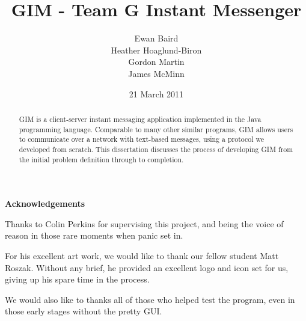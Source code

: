 \documentclass{l3proj}
\makeatletter
\newcommand\ackname{Acknowledgements}
\newenvironment{acknowledgements}{%
      \titlepage
      \null\vfil
      \@beginparpenalty\@lowpenalty
      \begin{center}%
        \bfseries \ackname
        \@endparpenalty\@M
      \end{center}}%
     {\par\vfil\null\endtitlepage}
\newenvironment{acknowledgements}{%
      \if@twocolumn
        \section*{\abstractname}%
      \else
        \small
        \begin{center}%
          {\bfseries \ackname\vspace{-.5em}\vspace{\z@}}%
        \end{center}%
        \quotation
      \fi}
      {\if@twocolumn\else\endquotation\fi}
\makeatother
\begin{document}
\title{GIM - Team G Instant Messenger}
\author{Ewan Baird \\
Heather Hoaglund-Biron \\
Gordon Martin \\
James McMinn}
\date{21 March 2011}
\maketitle

\begin{abstract}
GIM is a client-server instant messaging application implemented in the Java programming language. Comparable to many other similar programs, GIM allows users to communicate over a network with text-based messages, using a protocol we developed from scratch. This dissertation discusses the process of developing GIM from the initial problem definition through to completion.
\end{abstract}

\begin{acknowledgements}
Thanks to Colin Perkins for supervising this project, and being the voice of reason in those rare moments when panic set in.

For his excellent art work, we would like to thank our fellow student Matt Roszak. Without any brief, he provided an excellent logo and icon set for us, giving up his spare time in the process.

We would also like to thanks all of those who helped test the program, even in those early stages without the pretty GUI.
\end{acknowledgements}

\educationalconsent

\setcounter{tocdepth}{1}
\tableofcontents

















\end{document}
